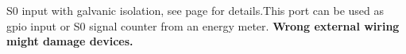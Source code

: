 S0 input with galvanic isolation, see page \pageref{fig:s0_input_application} for details.\newline This port can be used as gpio input or S0 signal counter from an energy meter.\newline 
\textbf{Wrong external wiring might damage devices.}